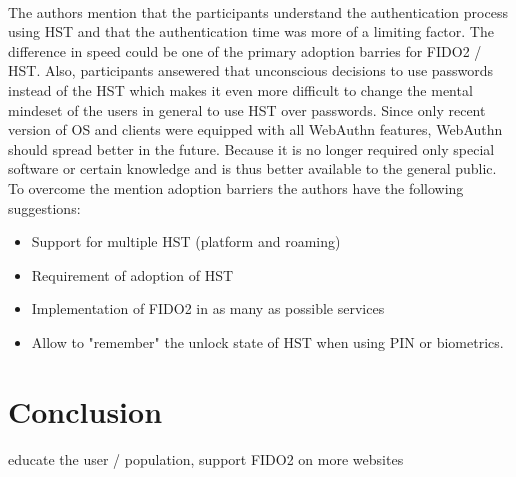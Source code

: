 \documentclass[runningheads]{llncs}
\begin{document}
\paragraph{}
The authors mention that the participants understand the authentication process using HST and that the authentication time was more of a limiting factor. The difference in speed could be one of the primary adoption barries for FIDO2 / HST. Also, participants ansewered that unconscious decisions to use passwords instead of the HST which makes it even more difficult to change the mental mindeset of the users in general to use HST over passwords. Since only recent version of OS and clients were equipped with all WebAuthn features, WebAuthn should spread better in the future. Because it is no longer required only special software or certain knowledge and is thus better available to the general public. To overcome the mention adoption barriers the authors have the following suggestions:
\begin{itemize}
  \item Support for multiple HST (platform and roaming)
  \item Requirement of adoption of HST
  \item Implementation of FIDO2 in as many as possible services
  \item Allow to "remember" the unlock state of HST when using PIN or biometrics.
\end{itemize}
\cite{255646}
\section{Conclusion}
educate the user / population, support FIDO2 on more websites


\end{document}
